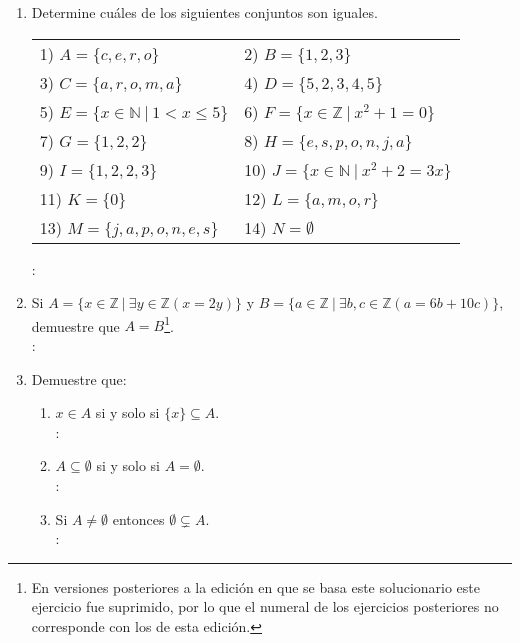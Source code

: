 \begin{enumerate}[label=1.1.\arabic*.]
	\item Determine cuáles de los siguientes conjuntos son iguales.
	\begin{flushleft}
		\begin{tabular}{ll}
			1) $ A = \{ c, e, r, o \} $ & 2) $ B = \{ 1, 2, 3 \} $ \\
			3) $ C = \{ a, r, o, m, a \} $ & 4) $ D = \{ 5, 2, 3, 4, 5 \} $ \\
			5) $ E = \{ x \in \mathbb{N} \ | \ 1 < x \leq 5 \} $ & 6) $ F = \{ x \in \mathbb{Z} \ | \ x^2 + 1 = 0 \} $ \\
			7) $ G = \{ 1, 2, 2 \} $ & 8) $ H = \{ e, s, p, o, n, j, a \} $ \\
			9) $ I = \{ 1, 2, 2, 3 \} $ & 10) $ J = \{ x \in \mathbb{N} \ | \ x^2 + 2  = 3x \} $ \\
			11) $ K = \{ 0 \} $ & 12) $ L = \{ a, m, o, r \} $ \\
			13) $ M = \{ j, a, p, o, n, e, s \} $ & 14) $ N = \emptyset $
		\end{tabular}
	\end{flushleft}
	\solucion: \\
	
	\item Si $ A = \{ x \in \mathbb{Z} \ | \ \exists y \in \mathbb{Z}(x = 2y) \} $ y $ B = \{ a \in \mathbb{Z} \ | \ \exists b, c \in \mathbb{Z} (a = 6b + 10c) \} $, demuestre que $ A = B $\footnote{En versiones posteriores a la edición en que se basa este solucionario este ejercicio fue suprimido, por lo que el numeral de los ejercicios posteriores no corresponde con los de esta edición.}. \\
	\solucion: \\
	
	\item Demuestre que:
	\begin{enumerate}[label=(\alph*)]
		\item $ x \in A $ si y solo si $ \{ x \} \subseteq A $. \\
		\solucion: \\
		
		\item $ A \subseteq \emptyset $ si y solo si $ A = \emptyset $. \\
		\solucion: \\
		
		\item Si $ A \neq \emptyset $ entonces $ \emptyset \varsubsetneq A  $. \\
		\solucion: \\
		

\end{enumerate}
\end{enumerate}
